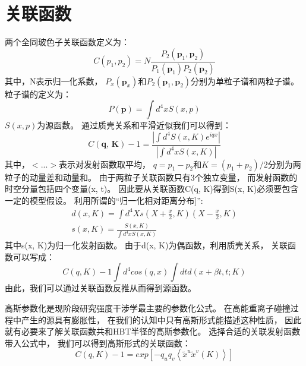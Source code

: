 \section{关联函数}
两个全同玻色子关联函数定义为：
\begin{equation}
  \label{eq:chapterSix1}
  C(p_{1}, p_{2}) = N\frac{P_{2}(\textbf{p}_{1}, \textbf{p}_{2})}{P_{1}(\textbf{p}_{1})P_{2}(\textbf{p}_{2})}
\end{equation}
其中，N表示归一化系数，%
$P_{x}(\textbf{p}_{x})$和$P_{2}(\textbf{p}_{1}, \textbf{p}_{2})$分别为单粒子谱和两粒子谱。%
粒子谱的定义为：
\begin{equation}
  \label{eq:chapterSix2}
  P(\textbf{p}) = \int{d^{4}xS(x,p)}
\end{equation}
$S(x,p)$为源函数。%
通过质壳关系和平滑近似我们可以得到：
\begin{equation}
  \label{eq:chapterSix3}
  C(\textbf{q, K}) - 1 = \frac{|\int{d^{4}S(x, K)e^{iqx}}|}{|\int{d^{4}xS(x, K)}|}
\end{equation}
其中，$<...>$表示对发射函数取平均，%
$q=p_{1}-p_{2}$和$K=(p_{1}+p_{2})/2$分别为两粒子的动量差和动量和。%
由于两粒子关联函数只有3个独立变量，%
而发射函数的时空分量包括四个变量(x, t)。%
因此要从关联函数C(q, K)得到S(x, K)必须要包含一定的模型假设。%
利用所谓的\textquotedblleft{归一化相对距离分布}]\textquotedblright{}:
\begin{gather}
  \label{eq:chapterSix4}
  d(x, K) = \int{d^{4}Xs(X+\frac{x}{2}, K)(X-\frac{x}{2}, K)}\\
  s(x, K) = \frac{S(x, K)}{\int{d^{4}xS(x, K)}}
\end{gather}
其中s(x, K)为归一化发射函数。%
由于d(x, K)为偶函数，利用质壳关系，%
关联函数可以写成：
\begin{equation}
  \label{eq:chapterSix5}
  C(q, K) -1 \int{d^{4}cos(q, x)}\int{dtd(x+\beta{t}, t; K)}
\end{equation}
由此，我们可以通过关联函数反推从而得到源函数。%
{\color{red}{在实际过程中，人们并不是直接由关联函数出发重构反射源，%
    而是先对反射函数时空结构进行一定的假设，%
    找到其与HBT之间的关联关系，%
    再反推回到发射源的时空信息。
  }}
\par
高斯参数化是现阶段研究强度干涉学最主要的参数化公式。%
在高能重离子碰撞过程中产生的源具有膨胀性，%
在我们的认知中只有高斯形式能描述这种性质，%
因此就有必要来了解关联函数共和HBT半径的高斯参数化。%
选择合适的关联发射函数带入公式中，%
我们可以得到高斯形式的关联函数：
\begin{equation}
  \label{eq:chapterSix6}
  C(q, K) - 1 = exp[-q_{u}q_{v}\left< \widetilde{x}^{u}\widetilde{x}^{v}(K)\right>]
\end{equation}

